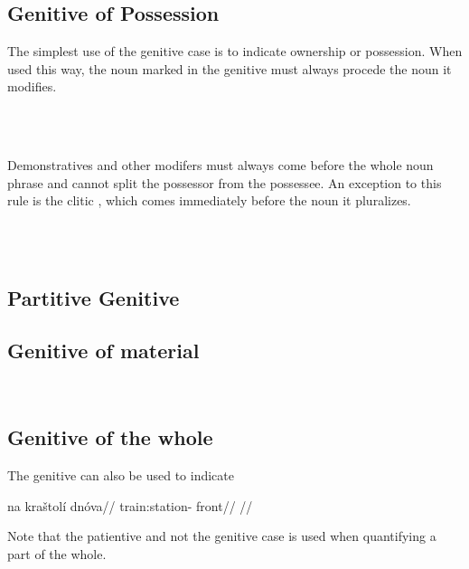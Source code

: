 \subsection{Genitive of Possession}

The simplest use of the genitive case is to indicate ownership or possession.
When used this way, the noun marked in the genitive must always procede the noun
it modifies.

\pex
{}\\
\\
\xe

Demonstratives and other modifers must always come before
the whole noun phrase and cannot split the possessor from the possessee. An
exception to this rule is the clitic , which comes immediately before
the noun it pluralizes.

\pex
\a  {}\\
\a  {}\\
\xe

\subsection{Partitive Genitive}

\subsection{Genitive of material}

\ex
{}\\
\irdp{}{}
\xe

\subsection{Genitive of the whole}
The genitive can also be used to indicate

\pex
\begingl
\gla na kra\v{s}tol\'i dn\'ova//
\glb {} train:station- front//
\glft {}//
\endgl
\xe

Note that the patientive and not the genitive case is used when quantifying a part of the whole.

